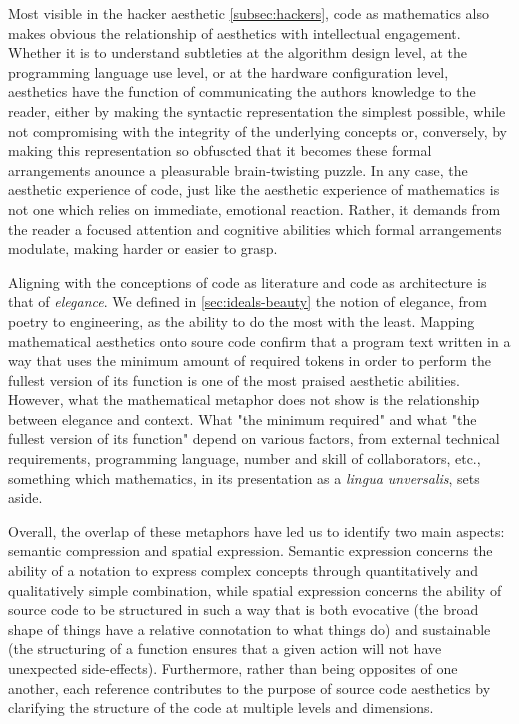 Most visible in the hacker aesthetic \ref{subsec:hackers}, code as mathematics also makes obvious the relationship of aesthetics with intellectual engagement. Whether it is to understand subtleties at the algorithm design level, at the programming language use level, or at the hardware configuration level, aesthetics have the function of communicating the authors knowledge to the reader, either by making the syntactic representation the simplest possible, while not compromising with the integrity of the underlying concepts or, conversely, by making this representation so obfuscted that it becomes these formal arrangements anounce a pleasurable brain-twisting puzzle. In any case, the aesthetic experience of code, just like the aesthetic experience of mathematics is not one which relies on immediate, emotional reaction. Rather, it demands from the reader a focused attention and cognitive abilities which formal arrangements modulate, making harder or easier to grasp.

Aligning with the conceptions of code as literature and code as architecture is that of \emph{elegance}. We defined in \ref{sec:ideals-beauty} the notion of elegance, from poetry to engineering, as the ability to do the most with the least. Mapping mathematical aesthetics onto soure code confirm that a program text written in a way that uses the minimum amount of required tokens in order to perform the fullest version of its function is one of the most praised aesthetic abilities. However, what the mathematical metaphor does not show is the relationship between elegance and context. What "the minimum required" and what "the fullest version of its function" depend on various factors, from external technical requirements, programming language, number and skill of collaborators, etc., something which mathematics, in its presentation as a \emph{lingua unversalis}, sets aside.

Overall, the overlap of these metaphors have led us to identify two main aspects: semantic compression and spatial expression. Semantic expression concerns the ability of a notation to express complex concepts through quantitatively and qualitatively simple combination, while spatial expression concerns the ability of source code to be structured in such a way that is both evocative (the broad shape of things have a relative connotation to what things do) and sustainable (the structuring of a function ensures that a given action will not have unexpected side-effects). Furthermore, rather than being opposites of one another, each reference contributes to the purpose of source code aesthetics by clarifying the structure of the code at multiple levels and dimensions.

